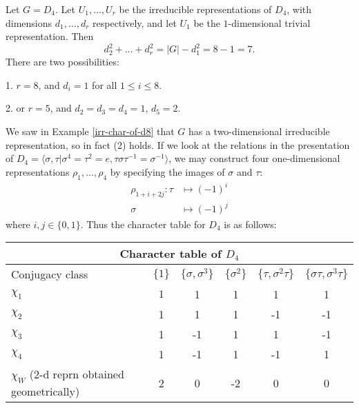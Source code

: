 \begin{example}
Let $G = D_4$.  Let $U_1, \ldots, U_r$ be the irreducible representations of $D_4$, with dimensions $d_1, \ldots, d_r$ respectively, and let $U_1$ be the $1$-dimensional trivial representation.  Then 
\[ d_2^2 + \ldots + d_r ^2 = |G| - d_1^2 = 8 - 1 = 7. \]
There are two possibilities:  

1.  $r=8$, and $d_i = 1$ for all $ 1 \leq i \leq 8$. 

2. or $r=5$, and $d_2 = d_3 = d_4 = 1$, $d_5 = 2$.

We saw in Example \ref{irr-char-of-d8} that $G$ has a two-dimensional irreducible representation, so in fact (2) holds. If we look at the relations in the presentation of $D_4=\langle \sigma, \tau |  \sigma^4 = \tau^2 = e, \tau \sigma \tau^{-1} = \sigma^{-1} \rangle$, we may construct four one-dimensional representations $\rho_1, \ldots, \rho_4$ by specifying the images of $\sigma$ and $\tau$:
 \begin{align*}
 \rho_{1 + i + 2j} \colon  \tau &\mapsto (-1)^i \\
	\sigma &\mapsto (-1)^j
 \end{align*}
where $i,j \in \{0,1\}$.  Thus the character table for $D_4$ is as follows:

\begin{tabular}{ | l | c | c | c |c | c |}\hline 
\multicolumn{6}{|c|}{Character table of $D_4$} \\ \hline
Conjugacy class  & $\{1\}$ & $ \{\sigma, \sigma^3\}$ & $\{\sigma^2\}$  & $\{\tau, \sigma^2 \tau\}$ & $\{\sigma\tau, \sigma^3 \tau\}$ \\ \hline
$\chi_1$ & $1$ & 1 & 1 & 1 & 1\\ \hline
$\chi_2$ & 1 & 1 & 1 & -1 & -1\\ \hline
$\chi_3$  & 1 & -1 & 1  & 1 & -1\\ \hline
$\chi_4$   & 1 & -1 & 1 & -1 & 1 \\ \hline
$\chi_W$ ($2$-d reprn obtained geometrically) & 2 & 0 & -2  & 0 & 0 \\
\hline
\end{tabular}
\end{example}

